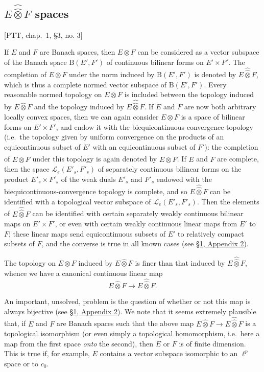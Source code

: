\documentclass[british]{article}
\newcommand{\oldpage}[1]{\marginpar{\footnotesize$\Big\vert$ \textit{p.~#1}}}
\begin{document}
\subsection{\texorpdfstring{\(E\hat{\hat{\otimes}}F\)
spaces}{E\textbackslash hat\{\textbackslash hat\{\textbackslash otimes\}\}F spaces}}\label{section-1.5}

{[}PTT, chap.~1, §3, no. 3{]}

\medskip

If \(E\) and \(F\) are Banach spaces, then \(E\otimes F\) can be
considered as a vector subspace of the Banach space
\(\mathrm{B}(E',F')\) of continuous bilinear forms on \(E'\times F'\).
\oldpage{82} The completion of \(E\otimes F\) under the norm induced by
\(\mathrm{B}(E',F')\) is denoted by \(E\hat{\hat{\otimes}}F\), which is
thus a complete normed vector subspace of \(\mathrm{B}(E',F')\). Every
reasonable normed topology on \(E\otimes F\) is included between the
topology induced by \(E\hat{\otimes}F\) and the topology induced by
\(E\hat{\hat{\otimes}}F\). If \(E\) and \(F\) are now both arbitrary
locally convex spaces, then we can again consider \(E\otimes F\) is a
space of bilinear forms on \(E'\times F'\), and endow it with the
biequicontinuous-convergence topology (i.e.~the topology given by
uniform convergence on the products of an equicontinuous subset of
\(E'\) with an equicontinuous subset of \(F'\)): the completion of
\(E\otimes F\) under this topology is again denoted by
\(E\hat{\hat{\otimes}}F\). If \(E\) and \(F\) are complete, then the
space \(\mathscr{L}_e(E'_s,F'_s)\) of separately continuous bilinear
forms on the product \(E'_s\times F'_s\) of the weak duals \(E'_s\) and
\(F'_s\) endowed with the biequicontinuous-convergence topology is
complete, and so \(E\hat{\hat{\otimes}}F\) can be identified with a
topological vector subspace of \(\mathscr{L}_e(E'_s,F'_s)\). Then the
elements of \(E\hat{\hat{\otimes}}F\) can be identified with certain
separately weakly continuous bilinear maps on \(E'\times F'\), or even
with certain weakly continuous linear maps from \(E'\) to \(F\); these
linear maps send equicontinuous subsets of \(E'\) to relatively compact
subsets of \(F\), and the converse is true in all known cases (see
\hyperref[section-1-appendix-2]{§1, Appendix 2}).

The topology on \(E\otimes F\) induced by \(E\hat{\otimes}F\) is finer
than that induced by \(E\hat{\hat{\otimes}}F\), whence we have a
canonical continuous linear map \[
  E\hat{\otimes}F \to E\hat{\hat{\otimes}}F.
\]

An important, unsolved, problem is the question of whether or not this
map is always bijective (see \hyperref[section-1-appendix-2]{§1,
Appendix 2}). We note that it seems extremely plausible that, if \(E\)
and \(F\) are Banach spaces such that the above map
\(E\hat{\otimes}F\to E\hat{\hat{\otimes}}F\) is a topological
isomorphism (or even simply a topological homomorphism, i.e.~here a map
from the first space \emph{onto} the second), then \(E\) or \(F\) is of
finite dimension. This is true if, for example, \(E\) contains a vector
subspace isomorphic to an \(\ell^p\) space or to \(c_0\).
\end{document}
